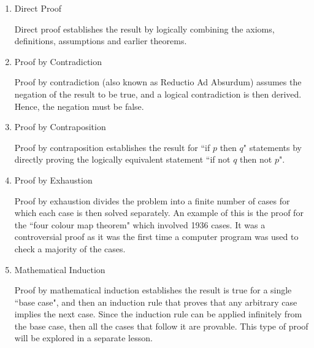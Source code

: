 \documentclass[11pt, a4paper, oneside]{exam}
\theoremstyle{definition}\newtheorem{define}{Definition}[section]
\theoremstyle{remark}\newtheorem{remark}{Remark}
\theoremstyle{definition}\newtheorem{example}{Example}[subsection]
\theoremstyle{definition}\newtheorem{notation}{Notation}[section]
\theoremstyle{definition}\newtheorem{theorem}{Theorem}[section]
\theoremstyle{definition}\newtheorem{corollary}{Corollary}[section]
\begin{document}
\begin{enumerate}
	\item Direct Proof

		Direct proof establishes the result by logically combining the axioms, definitions, assumptions and earlier theorems.

	\item Proof by Contradiction

		Proof by contradiction (also known as Reductio Ad Absurdum) assumes the negation of the result to be true, and a logical contradiction is then derived. Hence, the negation must be false. 

	\item Proof by Contraposition

		Proof by contraposition establishes the result for ``if $p$ then $q$" statements by directly proving the logically equivalent statement ``if not $q$ then not $p$". 

	\item Proof by Exhaustion

		Proof by exhaustion divides the problem into a finite number of cases for which each case is then solved separately. An example of this is the proof for the ``four colour map theorem" which involved 1936 cases. It was a controversial proof as it was the first time a computer program was used to check a majority of the cases.

	\item Mathematical Induction 

		Proof by mathematical induction establishes the result is true for a single ``base case", and then an induction rule that proves that any arbitrary case implies the next case. Since the induction rule can be applied infinitely from the base case, then all the cases that follow it are provable. This type of proof will be explored in a separate lesson.
\end{enumerate}

\newpage
\end{document}
